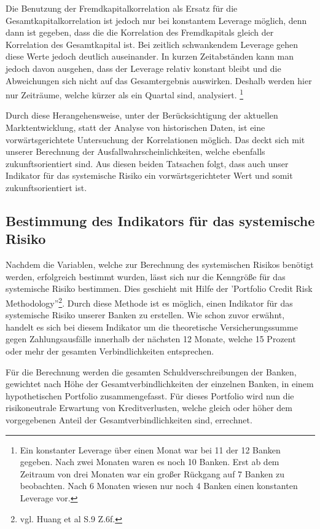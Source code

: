 \documentclass[a4paper,12pt]{scrartcl}
\begin{document}
Die Benutzung der Fremdkapitalkorrelation als Ersatz für die Gesamtkapitalkorrelation ist jedoch nur bei konstantem Leverage möglich, denn dann ist gegeben, dass die die Korrelation des Fremdkapitals gleich der Korrelation des Gesamtkapital ist. Bei zeitlich schwankendem Leverage gehen diese Werte jedoch deutlich auseinander. 
In kurzen Zeitabständen kann man jedoch davon ausgehen, dass der Leverage relativ konstant bleibt und die Abweichungen sich nicht auf das Gesamtergebnis auswirken. Deshalb werden hier nur Zeiträume, welche kürzer als ein Quartal sind, analysiert. \footnote{Ein konstanter Leverage über einen Monat war bei 11 der 12 Banken gegeben. Nach zwei Monaten waren es noch 10 Banken. Erst ab dem Zeitraum von drei Monaten war ein großer Rückgang auf 7 Banken zu beobachten. Nach 6 Monaten wiesen nur noch 4 Banken einen konstanten Leverage vor.}


Durch diese Herangehensweise, unter der Berücksichtigung der aktuellen Marktentwicklung, statt der Analyse von historischen Daten, ist eine vorwärtsgerichtete Untersuchung der Korrelationen möglich. Das deckt sich mit unserer Berechnung der Ausfallwahrscheinlichkeiten, welche ebenfalls zukunftsorientiert sind. Aus diesen beiden Tatsachen folgt, dass auch unser Indikator für das systemische Risiko ein vorwärtsgerichteter Wert und somit zukunftsorientiert ist. 

\subsection{Bestimmung des Indikators für das systemische Risiko}
Nachdem die Variablen, welche zur Berechnung des systemischen Risikos benötigt werden, erfolgreich bestimmt wurden, lässt sich nur die Kenngröße für das systemische Risiko bestimmen. Dies geschieht mit Hilfe der 'Portfolio Credit Risk Methodology''\footnote{vgl. Huang et al S.9 Z.6f.}. Durch diese Methode ist es möglich, einen Indikator für das systemische Risiko unserer Banken zu erstellen. Wie schon zuvor erwähnt, handelt es sich bei diesem Indikator um die theoretische Versicherungssumme gegen Zahlungsausfälle innerhalb der nächsten 12 Monate, welche 15 Prozent oder mehr der gesamten Verbindlichkeiten entsprechen.

Für die Berechnung werden die gesamten Schuldverschreibungen der Banken, gewichtet nach Höhe der Gesamtverbindlichkeiten der einzelnen Banken, in einem hypothetischen Portfolio zusammengefasst. Für dieses Portfolio wird nun die risikoneutrale Erwartung von Kreditverlusten, welche gleich oder höher dem vorgegebenen Anteil der Gesamtverbindlichkeiten sind, errechnet.
\end{document}
